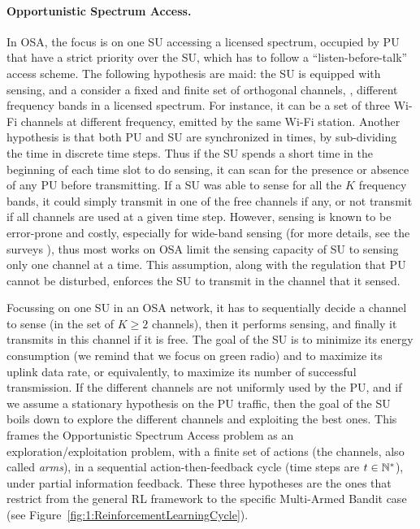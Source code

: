 \paragraph{Opportunistic Spectrum Access.}
%
In OSA, the focus is on one SU accessing a licensed spectrum, occupied by PU that have a strict priority over the SU, which has to follow a ``listen-before-talk'' access scheme.
%
The following hypothesis are maid:
the SU is equipped with sensing,
and a consider a fixed and finite set of orthogonal channels, \ie, different frequency bands in a licensed spectrum.
For instance, it can be a set of three Wi-Fi channels at different frequency, emitted by the same Wi-Fi station.
Another hypothesis is that both PU and SU are synchronized in times, by sub-dividing the time in discrete time steps.
%
Thus if the SU spends a short time in the beginning of each time slot to do sensing, it can scan for the presence or absence of any PU before transmitting.
If a SU was able to sense for all the $K$ frequency bands, it could simply transmit in one of the free channels if any, or not transmit if all channels are used at a given time step.
However, sensing is known to be error-prone and costly, especially for wide-band sensing (for more details, see the surveys \cite{yucek2009survey,subhedar2011spectrum}), thus most works on OSA limit the sensing capacity of SU to sensing only one channel at a time. This assumption, along with the regulation that PU cannot be disturbed, enforces the SU to transmit in the channel that it sensed.

Focussing on one SU in an OSA network, it has to sequentially decide a channel to sense (in the set of $K\geq2$ channels), then it performs sensing, and finally it transmits in this channel if it is free.
The goal of the SU is to minimize its energy consumption (we remind that we focus on green radio) and to maximize its uplink data rate, or equivalently, to maximize its number of successful transmission.
%
If the different channels are not uniformly used by the PU, and if we assume a stationary hypothesis on the PU traffic, then the goal of the SU boils down to explore the different channels and exploiting the best ones.
This frames the Opportunistic Spectrum Access problem as an exploration/exploitation problem, with a finite set of actions (the channels, also called \emph{arms}),
in a sequential action-then-feedback cycle (time steps are $t\in\mathbb{N}^*$),
under partial information feedback.
These three hypotheses are the ones that restrict from the general RL framework to the specific Multi-Armed Bandit case (see Figure~\ref{fig:1:ReinforcementLearningCycle}).


